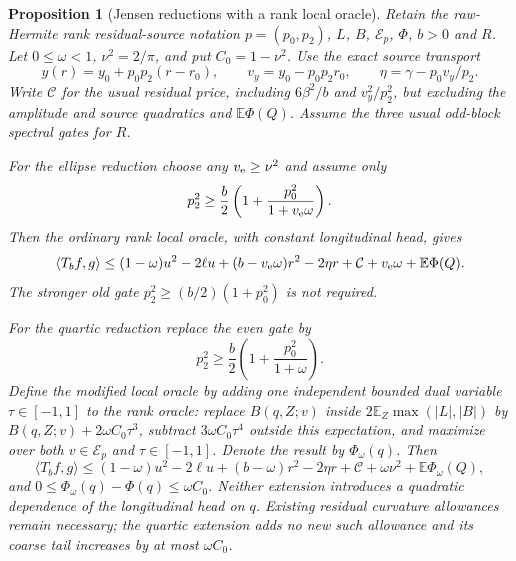 \documentclass{article}
\newtheorem{proposition}{Proposition}
\begin{document}
\begin{proposition}[Jensen reductions with a rank local oracle]
\label{prop:jensen-rank-reductions}
Retain the raw-Hermite rank residual-source notation
$p=(p_0,p_2)$, $L$, $B$, $\mathcal E_p$, $\Phi$, $b>0$ and $R$.
Let $0\le\omega<1$, $\nu^2=2/\pi$, and put $C_0=1-\nu^2$.
Use the exact source transport
\[
 y(r)=y_0+p_0p_2(r-r_0),\qquad v_y=y_0-p_0p_2r_0,
 \qquad \eta=\gamma-p_0v_y/p_2.
\]
Write $\mathcal C$ for the usual residual price, including
$6\beta^2/b$ and $v_y^2/p_2^2$, but excluding the amplitude and
source quadratics and $\mathbb E\Phi(Q)$.
Assume the three usual odd-block spectral gates for $R$.

For the ellipse reduction choose any $v_{\rm e}\ge\nu^2$ and assume only
\begin{equation}\label{eq:jensen-ellipse-even-gate}
 p_2^2\ge\frac b2\left(1+\frac{p_0^2}{1+v_{\rm e}\omega}\right).
\end{equation}
Then the ordinary rank local oracle, with constant longitudinal head,
gives
\begin{equation}\label{eq:jensen-ellipse-rank-price}
 \langle T_bf,g\rangle\le
 (1-\omega)u^2-2\ell u+(b-v_{\rm e}\omega)r^2-2\eta r
 +\mathcal C+v_{\rm e}\omega+\mathbb E\Phi(Q).
\end{equation}
The stronger old gate $p_2^2\ge(b/2)(1+p_0^2)$ is not required.

For the quartic reduction replace the even gate by
\begin{equation}\label{eq:jensen-quartic-even-gate}
 p_2^2\ge\frac b2\left(1+\frac{p_0^2}{1+\omega}\right).
\end{equation}
Define the modified local oracle by adding one independent bounded
dual variable $\tau\in[-1,1]$ to the rank oracle: replace $B(q,Z;v)$
inside $2\mathbb E_Z\max(|L|,|B|)$ by
$B(q,Z;v)+2\omega C_0\tau^3$, subtract $3\omega C_0\tau^4$
outside this expectation, and maximize over both $v\in\mathcal E_p$
and $\tau\in[-1,1]$. Denote the result by $\Phi_\omega(q)$.
Then
\begin{equation}\label{eq:jensen-quartic-rank-price}
 \langle T_bf,g\rangle\le
 (1-\omega)u^2-2\ell u+(b-\omega)r^2-2\eta r
 +\mathcal C+\omega\nu^2+\mathbb E\Phi_\omega(Q),
\end{equation}
and $0\le\Phi_\omega(q)-\Phi(q)\le\omega C_0$.
Neither extension introduces a quadratic dependence of the longitudinal
head on $q$. Existing residual curvature allowances remain necessary;
the quartic extension adds no new such allowance and its coarse tail
increases by at most $\omega C_0$.
\end{proposition}
\end{document}
